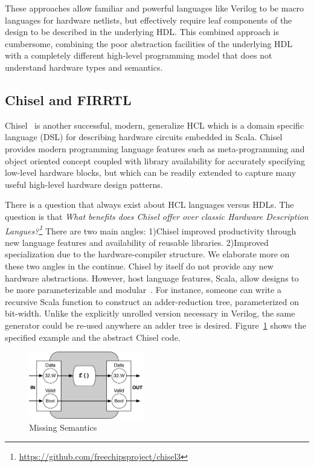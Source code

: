 These approaches allow familiar and powerful languages like Verilog to be macro languages for hardware netlists, but effectively require leaf components of the design to be described in the underlying HDL.
This combined approach is cumbersome, combining the poor abstraction facilities of the underlying HDL with a completely different high-level programming model that does not understand hardware types and semantics.

\subsection{Chisel and FIRRTL}

Chisel~\cite{chisel} is another successful, modern, generalize HCL which is a domain specific language (DSL) for describing hardware circuits embedded in Scala.
Chisel provides modern programming language features such as meta-programming and object oriented concept coupled with library availability for accurately specifying low-level hardware blocks, but which can be readily extended to capture many useful high-level hardware design patterns.

There is a question that always exist about HCL languages versus HDLs. The question is that \emph{What benefits does Chisel offer over classic Hardware Description Langues?\footnote{\url{https://github.com/freechipsproject/chisel3}}}
There are two main angles: 1)Chisel improved productivity through new language features and availability of reusable libraries. 2)Improved specialization due to the hardware-compiler structure. We elaborate more on these two angles in the continue.
Chisel by itself do not provide any new hardware abstractions. However, host language features, Scala, allow designs to be more parameterizable and modular~\cite{izraelevitz_2017_firrtl_reusability}.
For instance,  someone can write a recursive Scala function to construct an adder-reduction tree, parameterized on bit-width.
Unlike the explicitly unrolled version necessary in Verilog, the same generator could be re-used anywhere an adder tree is desired.
Figure~\ref{fig:filter} shows the specified example and the abstract Chisel code.

\begin{figure}[h]
    \centering
    \includegraphics[width=0.45\textwidth]{figures/Introduction/Filter.pdf}
    \caption{Missing Semantics}
    \label{fig:filter}
\end{figure}


